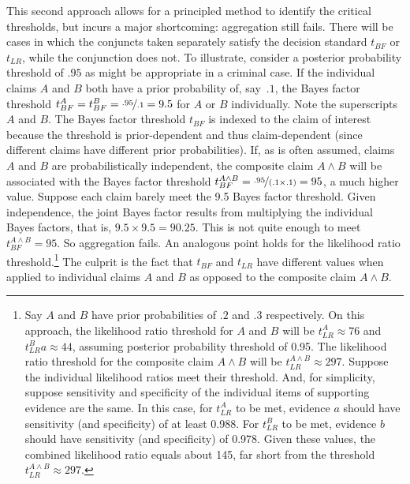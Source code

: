 \documentclass[
  10pt,
  dvipsnames,enabledeprecatedfontcommands]{scrartcl}
\begin{document}
This second approach allows for a principled method to identify the
critical thresholds, but incurs a major shortcoming: aggregation still
fails. There will be cases in which the conjuncts taken separately
satisfy the decision standard \(t_{BF}\) or \(t_{LR}\), while the
conjunction does not. To illustrate, consider a posterior probability
threshold of \(.95\) as might be appropriate in a criminal case. If the
individual claims \(A\) and \(B\) both have a prior probability of,
\mbox{say $.1$,} the Bayes factor threshold
\(t^A_{BF}=t_{BF}^B=\nicefrac{.95}{.1}=9.5\) for \(A\) or \(B\)
individually. Note the superscripts \(A\) and \(B\). The Bayes factor
threshold \(t_{BF}\) is indexed to the claim of interest because the
threshold is prior-dependent and thus claim-dependent (since different
claims have different prior probabilities). If, as is often assumed,
claims \(A\) and \(B\) are probabilistically independent, the composite
claim \(A \wedge B\) will be associated with the Bayes factor threshold
\(t^{A\wedge B}_{BF}=\nicefrac{.95}{(.1\times .1)}=95\), a much higher
value. Suppose each claim barely meet the 9.5 Bayes factor threshold.
Given independence, the joint Bayes factor results from multiplying the
individual Bayes factors, that is, \(9.5 \times 9.5=90.25\). This is not
quite enough to meet \(t^{A\wedge B}_{BF}=95\). So aggregation fails. An
analogous point holds for the likelihood ratio threshold.\footnote{Say
  \(A\) and \(B\) have prior probabilities of \(.2\) and \(.3\)
  respectively. On this approach, the likelihood ratio threshold for
  \(A\) and \(B\) will be \(t_{LR}^{A}\approx 76\) and
  \(t_{LR}^{B}a\approx 44\), assuming posterior probability threshold of
  0.95. The likelihood ratio threshold for the composite claim
  \(A \wedge B\) will be \(t^{A\wedge B}_{LR}\approx 297\). Suppose the
  individual likelihood ratios meet their threshold. And, for
  simplicity, suppose sensitivity and specificity of the individual
  items of supporting evidence are the same. In this case, for
  \(t_{LR}^{A}\) to be met, evidence \(a\) should have sensitivity (and
  specificity) of at least 0.988. For \(t_{LR}^{B}\) to be met, evidence
  \(b\) should have sensitivity (and specificity) of 0.978. Given these
  values, the combined likelihood ratio equals about 145, far short from
  the threshold \(t^{A\wedge B}_{LR}\approx 297\).} The culprit is the
fact that \(t_{BF}\) and \(t_{LR}\) have different values when applied
to individual claims \(A\) and \(B\) as opposed to the composite claim
\(A \wedge B\).
\end{document}
